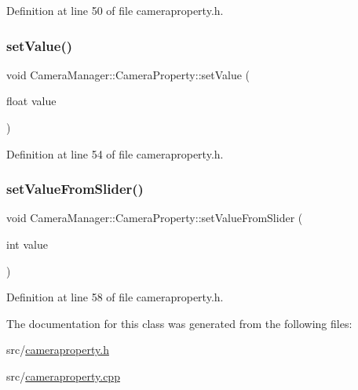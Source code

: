 Definition at line 50 of file cameraproperty.\+h.

\mbox{\label{class_camera_manager_1_1_camera_property_aabbcf30d6a190b57e87f9b5249a7614d}} 
\subsubsection{\texorpdfstring{setValue()}{setValue()}}
{\footnotesize\ttfamily void Camera\+Manager\+::\+Camera\+Property\+::set\+Value (\begin{DoxyParamCaption}\item[{float}]{value }\end{DoxyParamCaption})\hspace{0.3cm}{\ttfamily [inline]}}



Definition at line 54 of file cameraproperty.\+h.

\mbox{\label{class_camera_manager_1_1_camera_property_aebccd803702e01dbd9418b0ed4efba9a}} 
\subsubsection{\texorpdfstring{setValueFromSlider()}{setValueFromSlider()}}
{\footnotesize\ttfamily void Camera\+Manager\+::\+Camera\+Property\+::set\+Value\+From\+Slider (\begin{DoxyParamCaption}\item[{int}]{value }\end{DoxyParamCaption})\hspace{0.3cm}{\ttfamily [inline]}}



Definition at line 58 of file cameraproperty.\+h.



The documentation for this class was generated from the following files\+:\begin{DoxyCompactItemize}
\item 
src/\mbox{\hyperlink{cameraproperty_8h}{cameraproperty.\+h}}\item 
src/\mbox{\hyperlink{cameraproperty_8cpp}{cameraproperty.\+cpp}}\end{DoxyCompactItemize}

